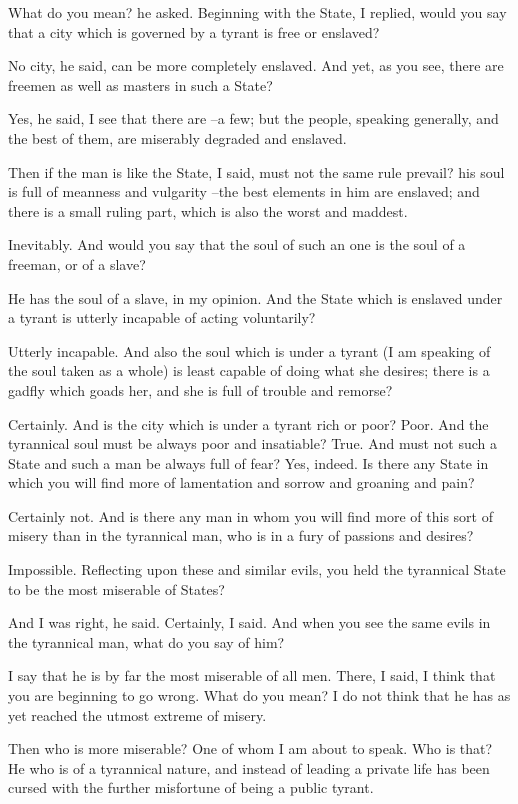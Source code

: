 What do you mean? he asked.
Beginning with the State, I replied, would you say that a city which is governed by a tyrant is free or enslaved?

No city, he said, can be more completely enslaved.
And yet, as you see, there are freemen as well as masters in such a State?

Yes, he said, I see that there are --a few; but the people, speaking generally, and the best of them, are miserably degraded and enslaved.

Then if the man is like the State, I said, must not the same rule prevail? his soul is full of meanness and vulgarity --the best elements in him are enslaved; and there is a small ruling part, which is also the worst and maddest.

Inevitably.
And would you say that the soul of such an one is the soul of a freeman, or of a slave?

He has the soul of a slave, in my opinion.
And the State which is enslaved under a tyrant is utterly incapable of acting voluntarily?

Utterly incapable.
And also the soul which is under a tyrant (I am speaking of the soul taken as a whole) is least capable of doing what she desires; there is a gadfly which goads her, and she is full of trouble and remorse?

Certainly.
And is the city which is under a tyrant rich or poor?
Poor.
And the tyrannical soul must be always poor and insatiable?
True.
And must not such a State and such a man be always full of fear?
Yes, indeed.
Is there any State in which you will find more of lamentation and sorrow and groaning and pain?

Certainly not.
And is there any man in whom you will find more of this sort of misery than in the tyrannical man, who is in a fury of passions and desires?

Impossible.
Reflecting upon these and similar evils, you held the tyrannical State to be the most miserable of States?

And I was right, he said.
Certainly, I said. And when you see the same evils in the tyrannical man, what do you say of him?

I say that he is by far the most miserable of all men.
There, I said, I think that you are beginning to go wrong.
What do you mean?
I do not think that he has as yet reached the utmost extreme of misery.

Then who is more miserable?
One of whom I am about to speak.
Who is that?
He who is of a tyrannical nature, and instead of leading a private life has been cursed with the further misfortune of being a public tyrant.

